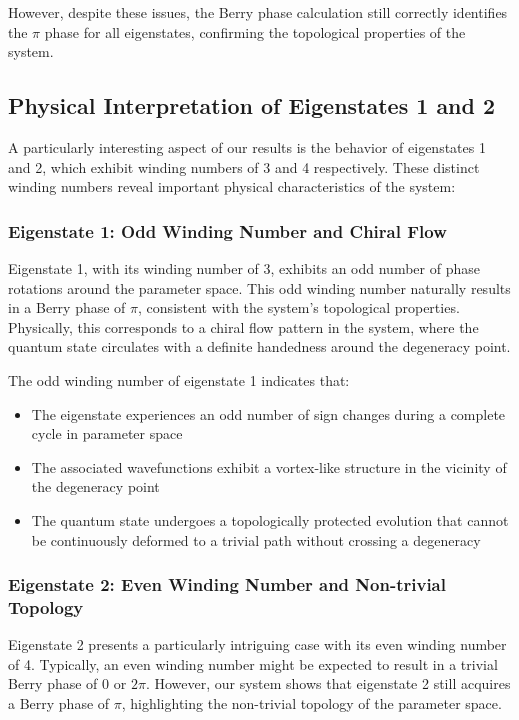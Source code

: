 However, despite these issues, the Berry phase calculation still correctly identifies the $\pi$ phase for all eigenstates, confirming the topological properties of the system.

\subsection{Physical Interpretation of Eigenstates 1 and 2}

A particularly interesting aspect of our results is the behavior of eigenstates 1 and 2, which exhibit winding numbers of 3 and 4 respectively. These distinct winding numbers reveal important physical characteristics of the system:

\subsubsection{Eigenstate 1: Odd Winding Number and Chiral Flow}

Eigenstate 1, with its winding number of 3, exhibits an odd number of phase rotations around the parameter space. This odd winding number naturally results in a Berry phase of $\pi$, consistent with the system's topological properties. Physically, this corresponds to a chiral flow pattern in the system, where the quantum state circulates with a definite handedness around the degeneracy point.

The odd winding number of eigenstate 1 indicates that:
\begin{itemize}
    \item The eigenstate experiences an odd number of sign changes during a complete cycle in parameter space
    \item The associated wavefunctions exhibit a vortex-like structure in the vicinity of the degeneracy point
    \item The quantum state undergoes a topologically protected evolution that cannot be continuously deformed to a trivial path without crossing a degeneracy
\end{itemize}

\subsubsection{Eigenstate 2: Even Winding Number and Non-trivial Topology}

Eigenstate 2 presents a particularly intriguing case with its even winding number of 4. Typically, an even winding number might be expected to result in a trivial Berry phase of 0 or $2\pi$. However, our system shows that eigenstate 2 still acquires a Berry phase of $\pi$, highlighting the non-trivial topology of the parameter space.

